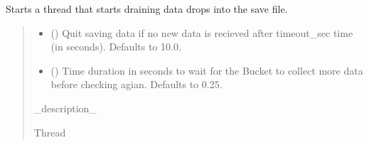 \documentclass[letterpaper,10pt,english]{sphinxmanual}
\begin{document}
\begin{fulllineitems}
\begin{fulllineitems}
\begin{quote}
\begin{description}
\end{description}\end{quote}

\end{fulllineitems}


\begin{fulllineitems}
\label{\detokenize{PodApi.Stream:PodApi.Stream.DrainToFile.DrainBucket.DrainBucketToFile}}
\pysigstartsignatures
{}
\pysigstopsignatures
\sphinxAtStartPar
Starts a thread that starts draining data drops into the save file.
\begin{quote}\begin{description}
\begin{itemize}
\item {} 
\sphinxAtStartPar
{} (\sphinxstyleliteralemphasis{\sphinxupquote{, }}) \textendash{} Quit saving data if no new data is recieved                 after timeout\_sec time (in seconds). Defaults to 10.0.

\item {} 
\sphinxAtStartPar
{} (\sphinxstyleliteralemphasis{\sphinxupquote{, }}) \textendash{} Time duration in seconds to wait for the Bucket to                 collect more data before checking agian. Defaults to 0.25.

\end{itemize}

\sphinxAtStartPar
\_description\_

\sphinxAtStartPar
Thread

\end{description}\end{quote}


\end{fulllineitems}
\end{fulllineitems}
\end{document}
